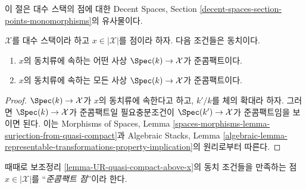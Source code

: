 \noindent
이 절은 대수 스택의 점에 대한 Decent Spaces, Section
\ref{decent-spaces-section-points-monomorphisms}의 유사물이다.

\begin{lemma}
\label{lemma-UR-quasi-compact-above-x}
$\mathcal{X}$를 대수 스택이라 하고 $x \in |\mathcal{X}|$를 점이라 하자.
다음 조건들은 동치이다.
\begin{enumerate}
\item $x$의 동치류에 속하는 어떤 사상
$\Spec(k) \to \mathcal{X}$가 준콤팩트이다.
\item $x$의 동치류에 속하는 모든 사상
$\Spec(k) \to \mathcal{X}$가 준콤팩트이다.
\end{enumerate}
\end{lemma}

\begin{proof}
$\Spec(k) \to \mathcal{X}$가 $x$의 동치류에 속한다고 하고,
$k'/k$를 체의 확대라 하자. 그러면 $\Spec(k) \to \mathcal{X}$가
준콤팩트일 필요충분조건이 $\Spec(k') \to \mathcal{X}$가 준콤팩트임을
보이면 된다. 이는 Morphisms of Spaces, Lemma
\ref{spaces-morphisms-lemma-surjection-from-quasi-compact}과
Algebraic Stacks, Lemma
\ref{algebraic-lemma-representable-transformations-property-implication}의
원리로부터 따른다.
\end{proof}

\noindent
때때로 보조정리 \ref{lemma-UR-quasi-compact-above-x}의 동치 조건들을 만족하는
점 $x \in |\mathcal{X}|$를 ``{\it 준콤팩트 점}''이라 한다.















